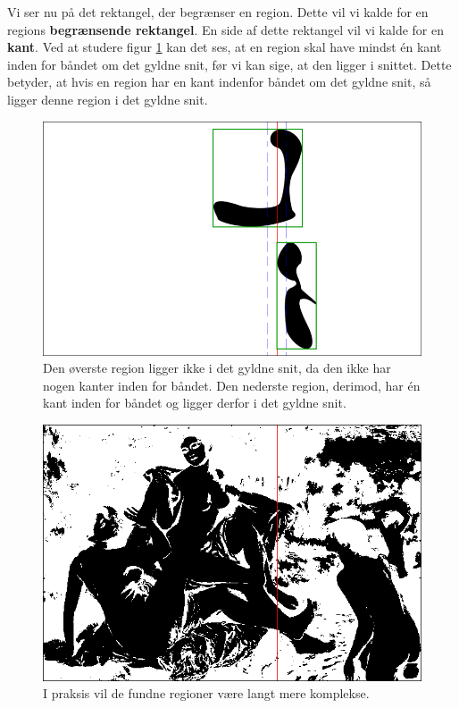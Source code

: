 {Vi ser nu på det rektangel, der begrænser en region. Dette vil vi kalde
for en regions \textbf{begrænsende rektangel}. En side af dette
rektangel vil vi kalde for en \textbf{kant}. Ved at studere figur
\ref{bbox_section} kan det ses, at en region skal have mindst én kant
inden for båndet om det gyldne snit, før vi kan sige, at den ligger i
snittet. Dette betyder, at hvis en region har en kant indenfor båndet om
det gyldne snit, så ligger denne region i det gyldne snit.

\begin{figure}[p]
    \begin{center}
        \includegraphics[scale=\imgscale,angle=0]{afsnit/vores_implementation/billeder/naiv_algoritme/bbox_section}
    \end{center}
    \caption[Begrænsende rektangler]{Den øverste region ligger ikke i
    det gyldne snit, da den ikke har nogen kanter inden for båndet. Den
    nederste region, derimod, har én kant inden for båndet og ligger
    derfor i det gyldne snit.} \label{bbox_section}
\end{figure}

\begin{figure}[p]
    \begin{center}
        \includegraphics[scale=0.42,angle=0]{afsnit/vores_implementation/billeder/naiv_algoritme/bathers_mockup_blob}
    \end{center}
    \caption[Interessante regioner i praksis]{I praksis vil de
    fundne regioner være langt mere komplekse.}
    \label{realworld_example}
\end{figure}

}
